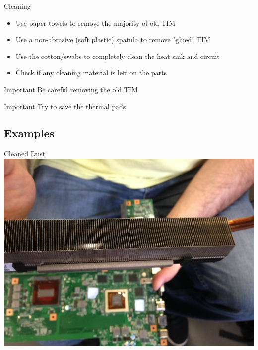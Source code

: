 \documentclass{beamer}
\begin{document}
\begin{frame}{Cleaning}
    \begin{itemize}
        \item Use paper towels to remove the majority of old TIM
        \item Use a non-abrasive (soft plastic) spatula to remove "glued" TIM
        \item Use the cotton/swabs to completely clean the heat sink and circuit
        \item Check if any cleaning material is left on the parts
    \end{itemize}
    \begin{alertblock}{Important}
        Be careful removing the old TIM
    \end{alertblock}
    \begin{alertblock}{Important}
        Try to save the thermal pads
    \end{alertblock}
\end{frame}

\subsection{Examples}

\begin{frame}{Cleaned Dust}
    \centering
    \includegraphics[scale=0.08]{cleaned-dust}
\end{frame}
\end{document}
